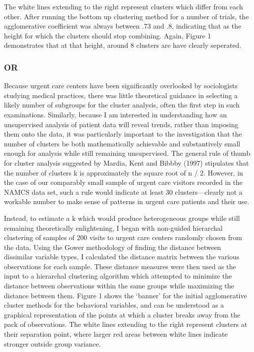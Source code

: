 \documentclass[12pt,twoside]{reedthesis}
\begin{document}
  The white lines extending to the right represent clusters which differ
  from each other. After running the bottom up clustering method for a
  number of trials, the agglomerative coefficient was always between .73
  and .8, indicating that as the height for which the clusters should stop
  combining. Again, Figure 1 demonstrates that at that height, around 8
  clusters are have clearly seperated.
  
  \subsubsection*{OR}\label{or}
  
  Because urgent care centers have been significantly overlooked by
  sociologists studying medical practices, there was little theoretical
  guidance in selecting a likely number of subgroups for the cluster
  analysis, often the first step in such examinations. Similarly, because
  I am interested in understanding how an unsupervised analysis of patient
  data will reveal trends, rather than imposing them onto the data, it was
  particularly important to the investigation that the number of clusters
  be both mathematically achievable and substantively small enough for
  analysis while still remaining unsupervised. The general rule of thumb
  for cluster analysis suggested by Mardia, Kent and Bibbby (1997)
  stipulates that the number of clusters k is approximately the square
  root of n / 2. However, in the case of our comparably small sample of
  urgent care visitors recorded in the NAMCS data set, such a rule would
  indicate at least 30 clusters---clearly not a workable number to make
  sense of patterns in urgent care patients and their use.
  
  Instead, to estimate a k which would produce heterogeneous groups while
  still remaining theoretically enlightening, I began with non-guided
  hierarchal clustering of samples of 200 visits to urgent care centers
  randomly chosen from the data. Using the Gower methodology of finding
  the distance between dissimilar variable types, I calculated the
  distance matrix between the various observations for each sample. These
  distance measures were then used as the input to a hierarchal clustering
  algorithm which attempted to minimize the distance between observations
  within the same groups while maximizing the distance between them.
  Figure 1 shows the `banner' for the initial agglomerative cluster
  methods for the behavioral variables, and can be understood as a
  graphical representation of the points at which a cluster breaks away
  from the pack of observations. The white lines extending to the right
  represent clusters at their separation point, where larger red areas
  between white lines indicate stronger outside group variance.
  
\end{document}
